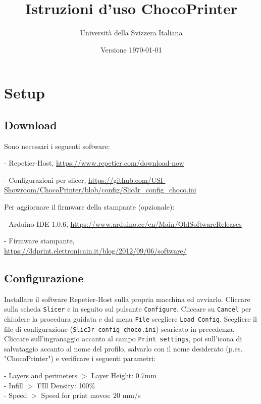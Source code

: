 \documentclass[12pt]{article}
\title{Istruzioni d'uso ChocoPrinter}
\author{Università della Svizzera Italiana}
\date{Versione \today}
\begin{document}
\maketitle
\tableofcontents
\newpage

\section{Setup}

	\subsection{Download}\label{sec:download}

		Sono necessari i seguenti software:

		- Repetier-Host, \url{https://www.repetier.com/download-now}

		- Configurazioni per slicer, \url{https://github.com/USI-Showroom/ChocoPrinter/blob/config/Slic3r_config_choco.ini}

		Per aggiornare il firmware della stampante (opzionale):

		- Arduino IDE 1.0.6, \url{https://www.arduino.cc/en/Main/OldSoftwareReleases}

		- Firmware stampante, \url{https://3dprint.elettronicain.it/blog/2012/09/06/software/}
		
		
	\subsection{Configurazione}\label{config}
	
		Installare il software Repetier-Host sulla propria macchina ed avviarlo. Cliccare sulla scheda \texttt{Slicer} e in seguito sul pulsante \texttt{Configure}. Cliccare su \texttt{Cancel} per chiudere la procedura guidata e dal menu \texttt{File} scegliere \texttt{Load Config}. Scegliere il file di configurazione (\texttt{Slic3r\_config\_choco.ini}) scaricato in precedenza.\\
		Cliccare sull'ingranaggio accanto al campo \texttt{Print settings}, poi sull'icona di salvataggio accanto al nome del profilo, salvarlo con il nome desiderato (p.es. "ChocoPrinter") e verificare i seguenti parametri:
		
		- Layers and perimeters $>$ Layer Height: 0.7mm\\
		- Infill $>$ FIll Density: 100\%\\
		- Speed $>$ Speed for print moves: 20 mm/s\\
		
\end{document}
